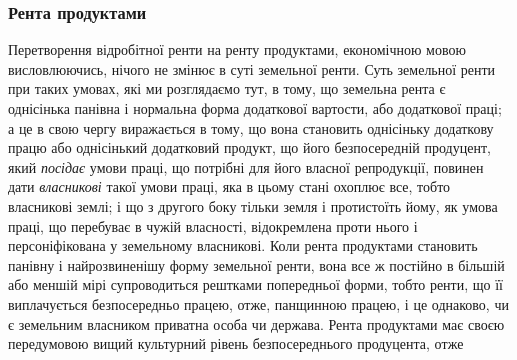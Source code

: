 \subsubsection{Рента продуктами}

Перетворення відробітної ренти на ренту продуктами, економічною мовою
висловлюючись, нічого не змінює в суті земельної ренти. Суть земельної ренти при
таких умовах, які ми розглядаємо тут, в тому, що земельна рента є однісінька
панівна і нормальна форма додаткової вартости, або додаткової праці; а це в
свою чергу виражається в тому, що вона становить однісіньку додаткову працю
або однісінький додатковий продукт, що його безпосередній продуцент, який
\emph{посідає} умови праці, що потрібні для його власної репродукції, повинен
дати \emph{власникові} такої умови праці, яка в цьому стані охоплює все, тобто
власникові землі; і що з другого боку тільки земля і протистоїть йому, як
умова праці, що перебуває в чужій власності, відокремлена проти нього і
персоніфікована у земельному власникові. Коли рента продуктами становить
панівну і найрозвиненішу форму земельної ренти, вона все ж постійно в більшій
або меншій мірі супроводиться рештками попередньої форми, тобто ренти, що
її виплачується безпосередньо працею, отже, панщинною працею, і це однаково,
чи є земельним власником приватна особа чи держава. Рента продуктами має
своєю передумовою вищий культурний рівень безпосереднього продуцента, отже
\parbreak{}  %
